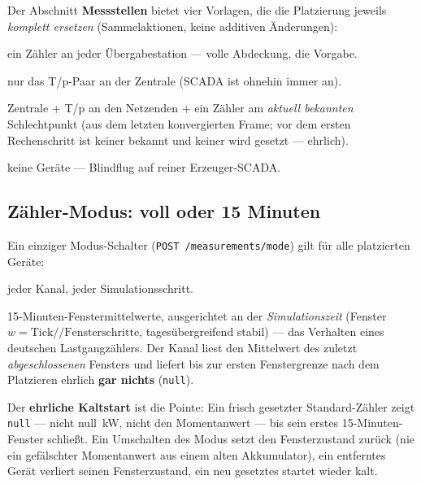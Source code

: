 \documentclass[11pt,a4paper,parskip=half]{scrreprt}
\newcommand{\ui}[1]{\textsf{\bfseries #1}}
\newcommand{\api}[1]{\texttt{#1}}
\begin{document}
Der Abschnitt \ui{Messstellen} bietet vier Vorlagen, die die Platzierung
jeweils \emph{komplett ersetzen} (Sammelaktionen, keine additiven Änderungen):

\begin{description}[nosep]
  \item[\ui{Alle Abnehmer}] ein Zähler an jeder Übergabestation --- volle
    Abdeckung, die Vorgabe.
  \item[\ui{Nur Erzeuger}] nur das T/p-Paar an der Zentrale (SCADA ist ohnehin
    immer an).
  \item[\ui{Schlüsselstellen}] Zentrale + T/p an den Netzenden + ein Zähler am
    \emph{aktuell bekannten} Schlechtpunkt (aus dem letzten konvergierten
    Frame; vor dem ersten Rechenschritt ist keiner bekannt und keiner wird
    gesetzt --- ehrlich).
  \item[\ui{Alles entfernen}] keine Geräte --- Blindflug auf reiner
    Erzeuger-SCADA.
\end{description}

\subsection*{Zähler-Modus: voll oder 15 Minuten}
\label{sec:fidelity}

Ein einziger Modus-Schalter (\api{POST /measurements/mode}) gilt für alle
platzierten Geräte:

\begin{description}[nosep]
  \item[\ui{Voll}] jeder Kanal, jeder Simulationsschritt.
  \item[\ui{Standard (15 min)}] 15-Minuten-Fenstermittelwerte, ausgerichtet an
    der \emph{Simulationszeit} (Fenster $w = \text{Tick} // \text{Fensterschritte}$,
    tagesübergreifend stabil) --- das Verhalten eines deutschen
    Lastgangzählers. Der Kanal liest den Mittelwert des zuletzt
    \emph{abgeschlossenen} Fensters und liefert bis zur ersten Fenstergrenze
    nach dem Platzieren ehrlich \textbf{gar nichts} (\texttt{null}).
\end{description}

Der \textbf{ehrliche Kaltstart} ist die Pointe: Ein frisch gesetzter
Standard-Zähler zeigt \texttt{null} --- nicht null~kW, nicht den Momentanwert
--- bis sein erstes 15-Minuten-Fenster schließt. Ein Umschalten des Modus setzt
den Fensterzustand zurück (nie ein gefälschter Momentanwert aus einem alten
Akkumulator), ein entferntes Gerät verliert seinen Fensterzustand, ein
neu gesetztes startet wieder kalt.
\end{document}
